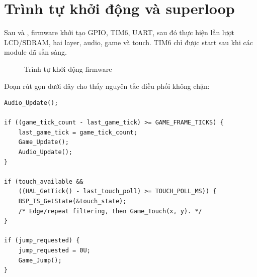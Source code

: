 \section{Trình tự khởi động và superloop}

Sau  và , firmware khởi tạo GPIO, TIM6, UART, sau đó thực hiện lần lượt LCD/SDRAM, hai layer, audio, game và touch. TIM6 chỉ được start sau khi các module đã sẵn sàng.

\begin{figure}[H]
  \centering
  \caption{Trình tự khởi động firmware}
  \label{fig:startup}
\end{figure}

Đoạn rút gọn dưới đây cho thấy nguyên tắc điều phối không chặn:

\begin{lstlisting}[caption={Điều phối tác vụ trong superloop},label={lst:superloop}]
Audio_Update();

if ((game_tick_count - last_game_tick) >= GAME_FRAME_TICKS) {
    last_game_tick = game_tick_count;
    Game_Update();
    Audio_Update();
}

if (touch_available &&
    ((HAL_GetTick() - last_touch_poll) >= TOUCH_POLL_MS)) {
    BSP_TS_GetState(&touch_state);
    /* Edge/repeat filtering, then Game_Touch(x, y). */
}

if (jump_requested) {
    jump_requested = 0U;
    Game_Jump();
}
\end{lstlisting}

